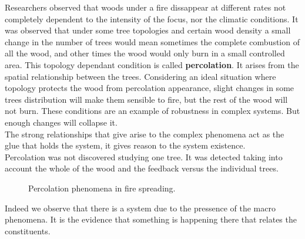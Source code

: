 \documentclass[11pt,oneside,a4paper,openright]{report}
\begin{document}

Researchers observed that woods under a fire dissappear at different rates not completely dependent to the intensity
of the focus, nor the climatic conditions. It was observed that under some tree topologies and certain wood
density a small change in the number of trees would mean sometimes the complete combustion of all the wood, and
other times the wood would only burn in a small controlled area. This topology dependant condition is called
\textbf{percolation}. It arises from the spatial relationship between the trees. Considering an ideal situation
where topology protects the wood from percolation appearance, slight changes in some trees distribution will make
them sensible to fire, but the rest of the wood will not burn. These conditions are an example of robustness
in complex systems. But enough changes will collapse it.\\
The strong relationships that give arise to the complex phenomena act as the glue that holds the system, it gives
reason to the system existence.\\ 
Percolation was not discovered studying one tree. It was detected taking into account the whole of the wood and the feedback versus the individual trees.\\

\begin{figure}[h!]
\centering
\setlength\fboxsep{0pt}
\setlength\fboxrule{0.5pt}
\caption{ Percolation phenomena in fire spreading.}
\label{fig:percolation_1}
\end{figure}

Indeed we observe that there is a system due to the pressence of the macro phenomena. It is the evidence that
something is happening there that relates the constituents.\\
\end{document}
